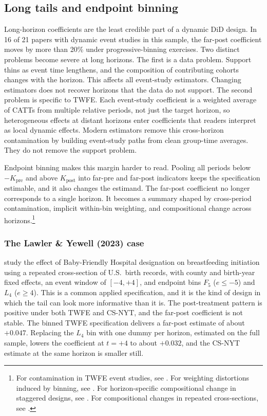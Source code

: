 \subsection{Long tails and endpoint binning}
\label{sec:binning}

Long-horizon coefficients are the least credible part of a dynamic DiD design. In 16 of 21 papers with dynamic event studies in this sample, the far-post coefficient moves by more than 20\% under progressive-binning exercises. Two distinct problems become severe at long horizons. The first is a data problem. Support thins as event time lengthens, and the composition of contributing cohorts changes with the horizon. This affects all event-study estimators. Changing estimators does not recover horizons that the data do not support. The second problem is specific to TWFE. Each event-study coefficient is a weighted average of CATTs from multiple relative periods, not just the target horizon, so heterogeneous effects at distant horizons enter coefficients that readers interpret as local dynamic effects. Modern estimators remove this cross-horizon contamination by building event-study paths from clean group-time averages. They do not remove the support problem.

Endpoint binning makes this margin harder to read. Pooling all periods below $-K_{\text{pre}}$ and above $K_{\text{post}}$ into far-pre and far-post indicators keeps the specification estimable, and it also changes the estimand. The far-post coefficient no longer corresponds to a single horizon. It becomes a summary shaped by cross-period contamination, implicit within-bin weighting, and compositional change across horizons.\footnote{For contamination in TWFE event studies, see \textcite{sun2021estimating}. For weighting distortions induced by binning, see \textcite{borusyak2023did_imputation}. For horizon-specific compositional change in staggered designs, see \textcite{callaway2021difference}. For compositional changes in repeated cross-sections, see \textcite{sant2026difference}.}

\subsubsection*{The Lawler \& Yewell (2023) case}

\textcite{lawler2023effect} study the effect of Baby-Friendly Hospital designation on breastfeeding initiation using a repeated cross-section of U.S.\ birth records, with county and birth-year fixed effects, an event window of $[-4,+4]$, and endpoint bins $F_5$ ($e \leq -5$) and $L_4$ ($e \geq 4$). This is a common applied specification, and it is the kind of design in which the tail can look more informative than it is. The post-treatment pattern is positive under both TWFE and CS-NYT, and the far-post coefficient is not stable. The binned TWFE specification delivers a far-post estimate of about $+0.047$. Replacing the $L_4$ bin with one dummy per horizon, estimated on the full sample, lowers the coefficient at $t=+4$ to about $+0.032$, and the CS-NYT estimate at the same horizon is smaller still.

